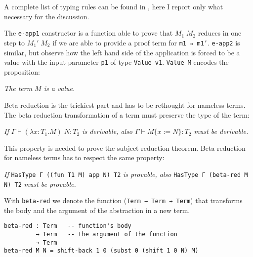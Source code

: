 \documentclass{article}
\begin{document}
\noindent
A complete list of typing rules can be found in \cite[p.\ 8]{crafa}, here I report only what necessary for the discussion.



The \texttt{e-app1} constructor is a function able to prove that $M_1 \; M_2$ reduces in one step to $M_1' \; M_2$ if we are able to provide a proof term for \texttt{m1 ⇒ m1'}.
\texttt{e-app2} is similar, but observe how the left hand side of the application is forced to be a value with the input parameter \texttt{p1} of type \texttt{Value v1}.
\texttt{Value M} encodes the proposition:

\vspace{1em}
\noindent
\textit{The term $M$ is a value.}
\vspace{1em}

\noindent
Beta reduction is the trickiest part and has to be rethought for nameless terms.
The beta reduction transformation of a term must preserve the type of the term:

\vspace{1em}
\noindent
\textit{If $\Gamma \vdash (\lambda x:T_1.M) \; N : T_2$ is derivable, also $\Gamma \vdash M\{x:=N\} : T_2$ must be derivable.}
\vspace{1em}

\noindent
This property is needed to prove the subject reduction theorem.
Beta reduction for nameless terms has to respect the same property:

\begin{stat}
\label{type-pres-beta}
\textit{If} \texttt{HasType Γ ((fun T1 M) app N) T2} \textit{is provable, also} \texttt{HasType Γ (beta-red M N) T2} \textit{must be provable.}
\end{stat}

\noindent
With \texttt{beta-red} we denote the function (\texttt{Term → Term → Term}) that transforms the body and the argument of the abstraction in a new term.

\begin{verbatim}
beta-red : Term   -- function's body
         → Term   -- the argument of the function
         → Term
beta-red M N = shift-back 1 0 (subst 0 (shift 1 0 N) M)
\end{verbatim}
\end{document}
